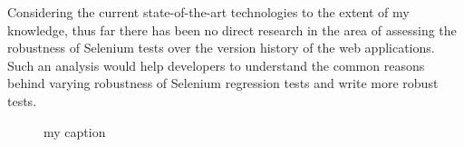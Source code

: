 
Considering the current state-of-the-art technologies to the extent of my knowledge, thus far there has been no direct research in the area of assessing the robustness of Selenium tests over the version history of the web applications. Such an analysis would help developers to understand the common reasons behind varying robustness of Selenium regression tests and write more robust tests.


\begin{figure}
\centering     %
{}
\vspace{-2mm}
\caption{my caption}
\label{fig:loginTest}
\end{figure} 

